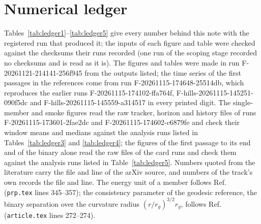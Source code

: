 \documentclass[aps,prd,twocolumn,10pt,superscriptaddress,nofootinbib,longbibliography,floatfix]{revtex4-2}
\begin{document}
\section{Numerical ledger}\label{app:ledger}

Tables~\ref{tab:ledger1}--\ref{tab:ledger5} give every number behind this note with the registered run that produced it; the inputs of each figure and table were checked against the checksums their runs recorded (one run of the scoping stage recorded no checksums and is read as it is). The figures and tables were made in run F-20261121-214141-256f945 from the outputs listed; the time series of the first passages in the references come from run F-20261115-174648-25514db, which reproduces the earlier runs F-20261115-174102-ffa764f, F-hills-20261115-145251-090f5dc and F-hills-20261115-145559-a314517 in every printed digit. The single-member and smoke figures read the raw tracker, horizon and history files of runs F-20261115-173601-2fae2dc and F-20261115-174602-c6879fe and check their window means and medians against the analysis runs listed in Tables~\ref{tab:ledger3} and \ref{tab:ledger4}; the figures of the first passage to its end and of the binary alone read the raw files of the card runs and check them against the analysis runs listed in Table~\ref{tab:ledger5}. Numbers quoted from the literature carry the file and line of the arXiv source, and numbers of the track's own records the file and line. The energy unit of a member follows Ref.~\cite{Sari:2010hills} (\texttt{prp.tex} lines 345--357); the consistency parameter of the geodesic reference, the binary separation over the curvature radius $(r/r_g)^{3/2}r_g$, follows Ref.~\cite{Manzaneda:2024geodesic} (\texttt{article.tex} lines 272--274).




\end{document}
